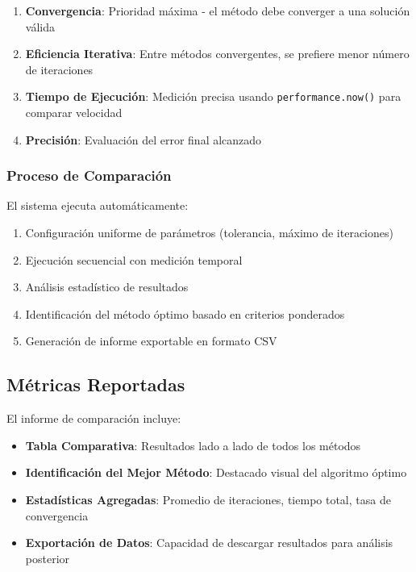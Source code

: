 \begin{enumerate}
    \item \textbf{Convergencia}: Prioridad máxima - el método debe converger a una solución válida
    \item \textbf{Eficiencia Iterativa}: Entre métodos convergentes, se prefiere menor número de iteraciones
    \item \textbf{Tiempo de Ejecución}: Medición precisa usando \texttt{performance.now()} para comparar velocidad
    \item \textbf{Precisión}: Evaluación del error final alcanzado
\end{enumerate}

\subsubsection{Proceso de Comparación}

El sistema ejecuta automáticamente:

\begin{enumerate}
    \item Configuración uniforme de parámetros (tolerancia, máximo de iteraciones)
    \item Ejecución secuencial con medición temporal
    \item Análisis estadístico de resultados
    \item Identificación del método óptimo basado en criterios ponderados
    \item Generación de informe exportable en formato CSV
\end{enumerate}

\subsection{Métricas Reportadas}

El informe de comparación incluye:

\begin{itemize}
    \item \textbf{Tabla Comparativa}: Resultados lado a lado de todos los métodos
    \item \textbf{Identificación del Mejor Método}: Destacado visual del algoritmo óptimo
    \item \textbf{Estadísticas Agregadas}: Promedio de iteraciones, tiempo total, tasa de convergencia
    \item \textbf{Exportación de Datos}: Capacidad de descargar resultados para análisis posterior
\end{itemize}

